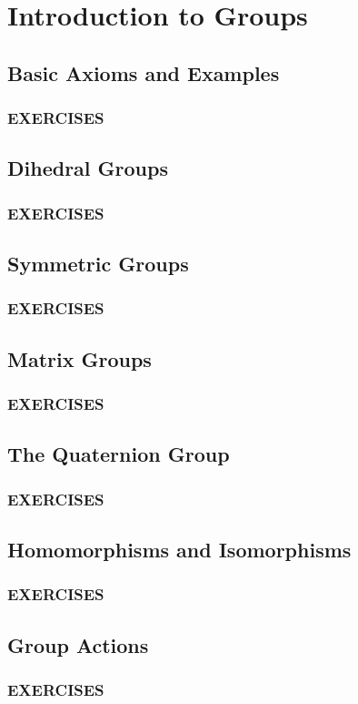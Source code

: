 \chapter{Introduction to Groups}

\section{Basic Axioms and Examples}
\subsection*{\centering EXERCISES}

\section{Dihedral Groups}
\subsection*{\centering EXERCISES}

\section{Symmetric Groups}
\subsection*{\centering EXERCISES}

\section{Matrix Groups}
\subsection*{\centering EXERCISES}

\section{The Quaternion Group}
\subsection*{\centering EXERCISES}

\section{Homomorphisms and Isomorphisms}
\subsection*{\centering EXERCISES}

\section{Group Actions}
\subsection*{\centering EXERCISES}
